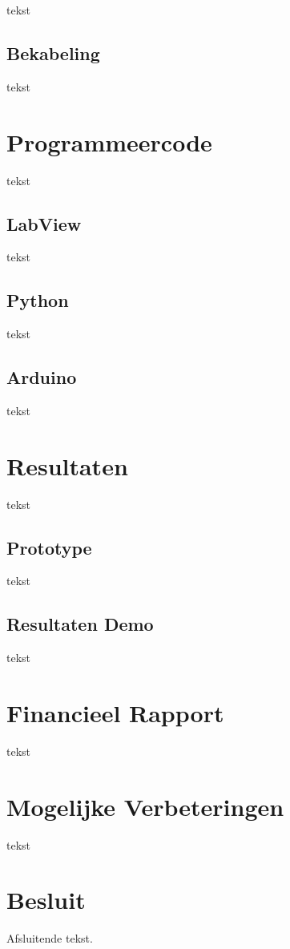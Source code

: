 \documentclass[kulak]{kulakarticle} %
\begin{document}
	tekst
	
	
	\subsection{Bekabeling}
	
	tekst
	
	
	
	\section{Programmeercode}
	
	tekst
	
	
	\subsection{LabView}
	
	tekst
	
	
	\subsection{Python}
	
	tekst
	
	
	\subsection{Arduino}
	
	tekst
	
	
	
	\section{Resultaten}
	
	tekst
	
	
	\subsection{Prototype}
	
	tekst
	
	
	\subsection{Resultaten Demo}
	
	tekst
	
	
	
	\section{Financieel Rapport}
	
	tekst
	
	
	
	\section{Mogelijke Verbeteringen}
	
	tekst
	
	
	
	\section*{Besluit}
	
	Afsluitende tekst.
	
	
	
	
	
	
	
	
\end{document}
